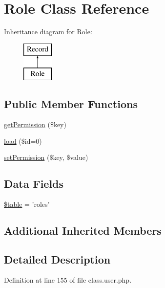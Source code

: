 \hypertarget{class_role}{\section{Role Class Reference}
\label{class_role}
}
Inheritance diagram for Role\-:\begin{figure}[H]
\begin{center}
\leavevmode
\includegraphics[height=2.000000cm]{class_role}
\end{center}
\end{figure}
\subsection*{Public Member Functions}
\begin{DoxyCompactItemize}
\item 
\hyperlink{class_role_a610dd05d53d99e1ddc05596468eb4914}{get\-Permission} (\$key)
\item 
\hyperlink{class_role_a7160b09d9d37ede69811a66dc9e4f272}{load} (\$id=0)
\item 
\hyperlink{class_role_a20b0e06124acf9f1e66afa1b1c8f996a}{set\-Permission} (\$key, \$value)
\end{DoxyCompactItemize}
\subsection*{Data Fields}
\begin{DoxyCompactItemize}
\item 
\hyperlink{class_role_ae8876a14058f368335baccf35af4a22b}{\$table} = 'roles'
\end{DoxyCompactItemize}
\subsection*{Additional Inherited Members}


\subsection{Detailed Description}


Definition at line 155 of file class.\-user.\-php.



